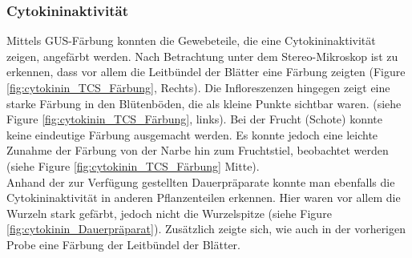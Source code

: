 \documentclass[10pt,a4paper]{article}
\begin{document}
		\subsubsection{Cytokininaktivität}
		Mittels GUS-Färbung konnten die Gewebeteile, die eine Cytokininaktivität zeigen, angefärbt werden. Nach Betrachtung unter dem Stereo-Mikroskop ist zu erkennen, dass vor allem die Leitbündel der Blätter eine Färbung zeigten (Figure \ref{fig:cytokinin_TCS_Färbung}, Rechts). Die Infloreszenzen hingegen zeigt eine starke Färbung in den Blütenböden, die als kleine Punkte sichtbar waren. (siehe Figure \ref{fig:cytokinin_TCS_Färbung}, links). Bei der Frucht (Schote) konnte keine eindeutige Färbung ausgemacht werden. Es konnte jedoch eine leichte Zunahme der Färbung von der Narbe hin zum Fruchtstiel, beobachtet werden (siehe Figure \ref{fig:cytokinin_TCS_Färbung} Mitte).\\
		Anhand der zur Verfügung gestellten Dauerpräparate konnte man ebenfalls die Cytokininaktivität in anderen Pflanzenteilen erkennen. Hier waren vor allem die Wurzeln stark gefärbt, jedoch nicht die Wurzelspitze (siehe Figure \ref{fig:cytokinin_Dauerpräparat}). Zusätzlich zeigte sich, wie auch in der vorherigen Probe eine Färbung der Leitbündel der Blätter. 
		
\end{document}
